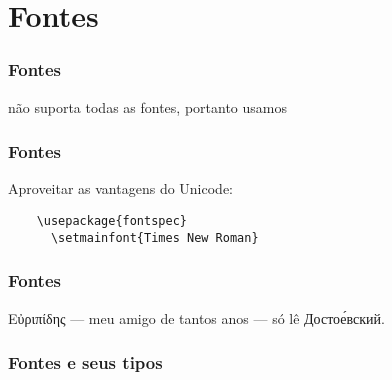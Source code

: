 \section{Fontes}

\begin{frame}
  \frametitle{Fontes}
  \huge
   não suporta todas as fontes, portanto usamos 
\end{frame}

\begin{frame}[fragile]
  \frametitle{Fontes}
  \huge
  Aproveitar as vantagens do Unicode:
  \begin{verbatim}
    \usepackage{fontspec}
      \setmainfont{Times New Roman}
  \end{verbatim}
\end{frame}

\begin{frame}
  \frametitle{Fontes}
  \Huge
  Εὐριπίδης — meu amigo de tantos anos — só lê Достое́вский.
\end{frame}

\begin{frame}[fragile]
  \frametitle{Fontes e seus tipos}
  \Huge
\end{frame}

